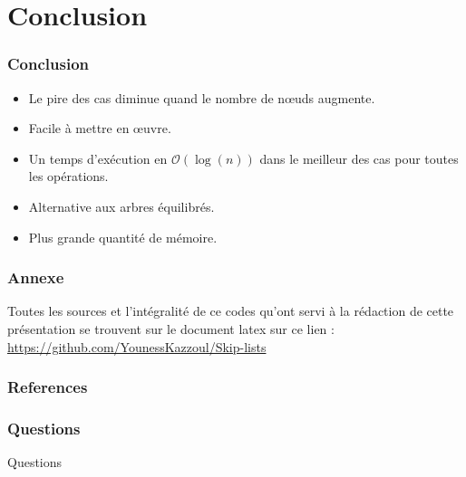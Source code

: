 \documentclass{beamer}
\begin{document}

\section[Conclusion]{Conclusion}

\begin{frame}
	\frametitle{Conclusion}
	\begin{itemize}
		\item Le pire des cas diminue quand le nombre de nœuds augmente. \\[.2cm]
		\item Facile à mettre en œuvre. \\[.2cm]
		\item Un temps d'exécution en $\mathcal{O}(\log(n))$ dans le meilleur des cas pour toutes les opérations.\\[.2cm]
		\item Alternative aux arbres équilibrés. \\[.2cm]		
		\item Plus grande quantité de mémoire.

	\end{itemize}
	
\end{frame}	


\begin{frame}  
	\frametitle{Annexe}
	
	Toutes les sources et l’intégralité de ce codes qu'ont servi à la rédaction de cette présentation se trouvent sur le document latex sur ce lien : \\[.5cm]
	\href{https://github.com/YounessKazzoul/Skip-lists}{https://github.com/YounessKazzoul/Skip-lists} 
	
\end{frame}


\begin{frame}  
	\frametitle{References}
	
	 	
\end{frame}


\begin{frame}
	\frametitle{Questions}
	\begin{center}
		Questions 
	\end{center}
\end{frame}	
\end{document}
